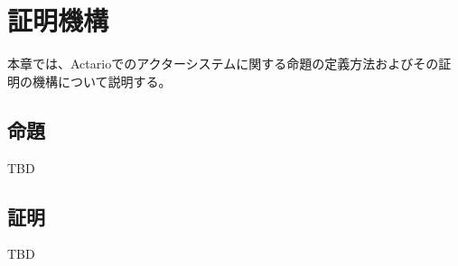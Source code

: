 \chapter{証明機構}

本章では、Actarioでのアクターシステムに関する命題の定義方法およびその証明の機構について説明する。

\section{命題}

TBD

\section{証明}

TBD
